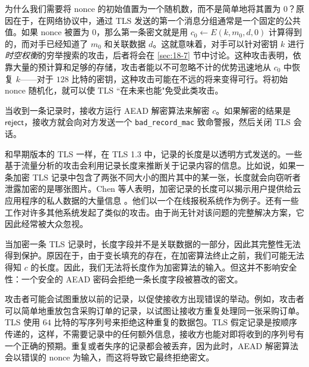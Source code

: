 \begin{snote}
为什么我们需要将 nonce 的初始值置为一个随机数，而不是简单地将其置为 $0$？原因在于，在网络协议中，通过 TLS 发送的第一个消息分组通常是一个固定的公共值。如果 nonce 被置为 $0$，那么第一条密文就是用 $c_0\leftarrow E(k,m_0,d,0)$ 计算得到的，而对手已经知道了 $m_0$ 和关联数据 $d$。这就意味着，对手可以针对密钥 $k$ 进行\emph{时空权衡}的穷举搜索的攻击，后者将会在 \ref{sec:18-7} 节中讨论。这种攻击表明，依靠大量的预计算和足够的存储，攻击者能以不可忽略不计的优势迅速地从 $c_0$ 中恢复 $k$——对于 $128$ 比特的密钥，这种攻击可能在不远的将来变得可行。将初始 nonce 随机化，就可以使 TLS ``在未来也能"免受此类攻击。

当收到一条记录时，接收方运行 AEAD 解密算法来解密 $c$。如果解密的结果是 $\mathsf{reject}$，接收方就会向对方发送一个 \texttt{bad\_record\_mac} 致命警报，然后关闭 TLS 会话。
\end{snote}

\begin{snote}[长度字段。]
和早期版本的 TLS 一样，在 TLS 1.3 中，记录的长度是以透明方式发送的。一些基于流量分析的攻击会利用记录长度来推断关于记录内容的信息。比如说，如果一条加密 TLS 记录中包含了两张不同大小的图片其中的某一张，长度就会向窃听者泄露加密的是哪张图片。Chen 等人表明，加密记录的长度可以揭示用户提供给云应用程序的私人数据的大量信息 \cite{chen2010side}。他们以一个在线报税系统作为例子。还有一些工作对许多其他系统发起了类似的攻击。由于尚无针对该问题的完整解决方案，它因此经常被大众忽视。

当加密一条 TLS 记录时，长度字段并不是关联数据的一部分，因此其完整性无法得到保护。原因在于，由于变长填充的存在，在加密算法终止之前，我们可能无法得知 $c$ 的长度。因此，我们无法将长度作为加密算法的输入。但这并不影响安全性：一个安全的 AEAD 密码会拒绝一条长度字段被篡改的密文。
\end{snote}

\begin{snote}[防止重放。]
攻击者可能会试图重放以前的记录，以促使接收方出现错误的举动。例如，攻击者可以简单地重放包含采购订单的记录，以试图让接收方重复处理同一张采购订单。TLS 使用 $64$ 比特的写序列号来拒绝这种重复的数据包。TLS 假定记录是按顺序传递的，这样，不需要记录中的任何额外信息，接收方也能对即将收到的序列号有一个正确的预期。重复或者失序的记录都会被丢弃，因为此时，AEAD 解密算法会以错误的 nonce 为输入，而这将导致它最终拒绝密文。
\end{snote}

